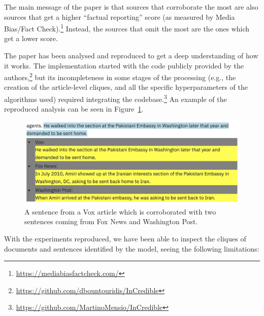 The main message of the paper is that sources that \gls{corroborate} the most are also sources that get a higher ``factual reporting'' score (as measured by Media Bias/Fact Check).\footnote{\url{https://mediabiasfactcheck.com/}}
Instead, the sources that \gls{omit} the most are the ones which get a lower score.


The paper has been analysed and reproduced to get a deep understanding of how it works. The implementation started with the code publicly provided by the authors,\footnote{\url{https://github.com/dbountouridis/InCredible}} but its incompleteness in some stages of the processing (e.g., the creation of the article-level cliques, and all the specific hyperparameters of the algorithms used) required integrating the codebase.\footnote{\url{https://github.com/MartinoMensio/InCredible}}
An example of the reproduced analysis can be seen in Figure~\ref{fig:cluster_similar_sentences_amiri}.

\begin{figure}[!htbp]
    \centering
    \includegraphics[width=\linewidth]{figures/cluster_similar_sentences_amiri.png}
    \caption{A sentence from a Vox article which is corroborated with two sentences coming from Fox News and Washington Post.}
    \label{fig:cluster_similar_sentences_amiri}
\end{figure}

With the experiments reproduced, we have been able to inspect the cliques of documents and sentences identified by the model, seeing the following limitations:

